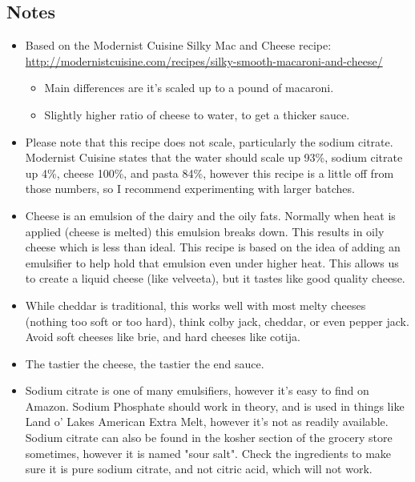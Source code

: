 \begin{multicols}{2}
\subsection*{Notes}
\begin{itemize}
    \item Based on the Modernist Cuisine Silky Mac and Cheese recipe: \url{http://modernistcuisine.com/recipes/silky-smooth-macaroni-and-cheese/}
    \begin{itemize}
        \item Main differences are it's scaled up to a pound of macaroni.
        \item Slightly higher ratio of cheese to water, to get a thicker sauce.
    \end{itemize}
    \item Please note that this recipe does not scale, particularly the sodium citrate. Modernist Cuisine states that the water should scale up 93\%, sodium citrate up 4\%, cheese 100\%, and pasta 84\%, however this recipe is a little off from those numbers, so I recommend experimenting with larger batches.
    \item Cheese is an emulsion of the dairy and the oily fats. Normally when heat is applied (cheese is melted) this emulsion breaks down. This results in oily cheese which is less than ideal. This recipe is based on the idea of adding an emulsifier to help hold that emulsion even under higher heat. This allows us to create a liquid cheese (like velveeta), but it tastes like good quality cheese.
    \item While cheddar is traditional, this works well with most melty cheeses (nothing too soft or too hard), think colby jack, cheddar, or even pepper jack. Avoid soft cheeses like brie, and hard cheeses like cotija.
    \item The tastier the cheese, the tastier the end sauce.
    \item Sodium citrate is one of many emulsifiers, however it's easy to find on Amazon. Sodium Phosphate should work in theory, and is used in things like Land o' Lakes American Extra Melt, however it's not as readily available. Sodium citrate can also be found in the kosher section of the grocery store sometimes, however it is named "sour salt". Check the ingredients to make sure it is pure sodium citrate, and not citric acid, which will not work.
\end{itemize}
\end{multicols}
\clearpage